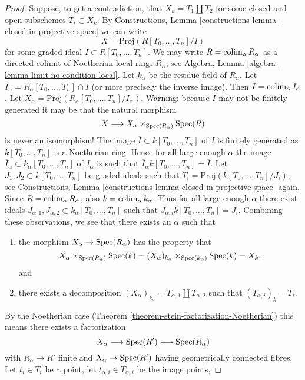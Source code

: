 \begin{proof}
\medskip\noindent
Suppose, to get a contradiction,
that $X_k = T_1 \coprod T_2$ for some closed and open subschemes
$T_i \subset X_k$. By
Constructions, Lemma \ref{constructions-lemma-closed-in-projective-space}
we can write
$$
X = \text{Proj}(R[T_0, \ldots, T_n]/I)
$$
for some graded ideal $I \subset R[T_0, \ldots, T_n]$.
We may write $R = \mathop{\rm colim}\nolimits_\alpha R_\alpha$ as a directed
colimit of Noetherian local rings $R_\alpha$, see
Algebra, Lemma \ref{algebra-lemma-limit-no-condition-local}.
Let $k_\alpha$ be the residue field of $R_\alpha$.
Let $I_\alpha = R_\alpha[T_0, \ldots, T_n] \cap I$ (or more precisely
the inverse image). Then $I = \mathop{\rm colim}\nolimits_\alpha I_\alpha$. Let
$X_\alpha = \text{Proj}(R_\alpha[T_0, \ldots, T_n]/I_\alpha)$.
Warning: because $I$ may not be finitely generated it may be
that the natural morphism
$$
X \longrightarrow X_\alpha \times_{\mathop{\rm Spec}(R_\alpha)} \mathop{\rm Spec}(R)
$$
is never an isomorphism!
The image $\overline{I} \subset k[T_0, \ldots, T_n]$ of $I$ is finitely
generated as $k[T_0, \ldots, T_n]$ is a Noetherian ring.
Hence for all large enough $\alpha$ the image
$\overline{I}_\alpha \subset k_\alpha[T_0, \ldots, T_n]$
of $I_\alpha$ is such that
$\overline{I}_\alpha k[T_0, \ldots, T_n] = \overline{I}$.
Let $J_1, J_2 \subset k[T_0, \ldots, T_n]$ be graded ideals such
that $T_i = \text{Proj}(k[T_0, \ldots, T_n]/J_i)$, see
Constructions, Lemma \ref{constructions-lemma-closed-in-projective-space}
again. Since $R = \mathop{\rm colim}\nolimits_\alpha R_\alpha$, also
$k = \mathop{\rm colim}\nolimits_\alpha k_\alpha$.
Thus for all large enough $\alpha$ there exist ideals
$J_{\alpha, 1}, J_{\alpha, 2} \subset k_\alpha[T_0, \ldots, T_n]$
such that $J_{\alpha, i} k[T_0, \ldots, T_n] = J_i$.
Combining these observations, we see that there exists
an $\alpha$ such that
\begin{enumerate}
\item the morphism $X_\alpha \to \mathop{\rm Spec}(R_\alpha)$
has the property that
$$
X_\alpha \times_{\mathop{\rm Spec}(R_\alpha)} \mathop{\rm Spec}(k)
=
(X_\alpha)_{k_\alpha} \times_{\mathop{\rm Spec}(k_\alpha)} \mathop{\rm Spec}(k)
=
X_k,
$$
and
\item there exists a decomposition
$(X_\alpha)_{k_\alpha} = T_{\alpha, 1} \coprod T_{\alpha, 2}$ such
that $(T_{\alpha, i})_k = T_i$.
\end{enumerate}
By the Noetherian case (Theorem \ref{theorem-stein-factorization-Noetherian})
this means there exists a factorization
$$
X_\alpha \longrightarrow
\mathop{\rm Spec}(R') \longrightarrow
\mathop{\rm Spec}(R_\alpha)
$$
with $R_\alpha \to R'$ finite and $X_\alpha \to \mathop{\rm Spec}(R')$
having geometrically connected fibres. Let $t_i \in T_i$
be a point, let $t_{\alpha, i} \in T_{\alpha, i}$ be the image points,

\end{proof}

